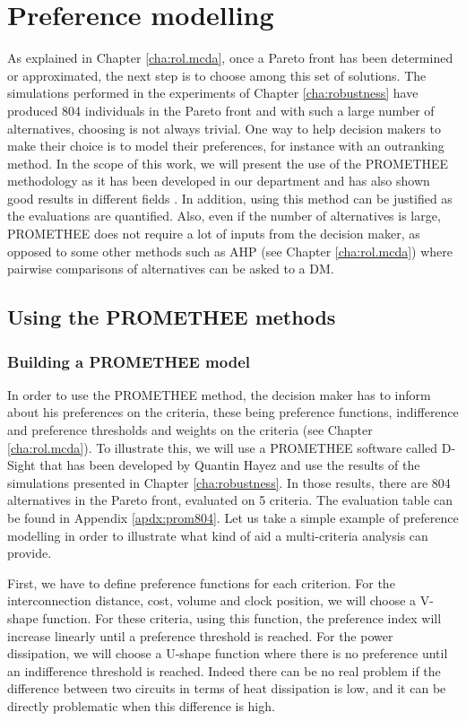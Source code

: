 \section{Preference modelling}
As explained in Chapter \ref{cha:rol.mcda}, once a Pareto front has been determined or approximated, the next step is to choose among this set of solutions. The simulations performed in the experiments of Chapter \ref{cha:robustness} have produced 804 individuals in the Pareto front and with such a large number of alternatives, choosing is not always trivial. One way to help decision makers to make their choice is to model their preferences, for instance with an outranking method. In the scope of this work, we will present the use of the PROMETHEE methodology as it has been developed in our department and has also shown good results in different fields \cite{Beh2010}. In addition, using this method can be justified as the evaluations are quantified. Also, even if the number of alternatives is large, PROMETHEE does not require a lot of inputs from the decision maker, as opposed to some other methods such as AHP (see Chapter \ref{cha:rol.mcda}) where pairwise comparisons of alternatives can be asked to a DM.

\subsection{Using the PROMETHEE methods}

\subsubsection{Building a PROMETHEE model}
In order to use the PROMETHEE method, the decision maker has to inform about his preferences on the criteria, these being preference functions, indifference and preference thresholds and weights on the criteria (see Chapter \ref{cha:rol.mcda}). To illustrate this, we will use a PROMETHEE software called D-Sight that has been developed by Quantin Hayez and use the results of the simulations presented in Chapter \ref{cha:robustness}. In those results, there are 804 alternatives in the Pareto front, evaluated on 5 criteria. The evaluation table can be found in Appendix \ref{apdx:prom804}. Let us take a simple example of preference modelling in order to illustrate what kind of aid a multi-criteria analysis can provide.

First, we have to define preference functions for each criterion. For the interconnection distance, cost, volume and clock position, we will choose a V-shape function. For these criteria, using this function, the preference index will increase linearly until a preference threshold is reached. For the power dissipation, we will choose a U-shape function where there is no preference until an indifference threshold is reached. Indeed there can be no real problem if the difference between two circuits in terms of heat dissipation is low, and it can be directly problematic when this difference is high.

